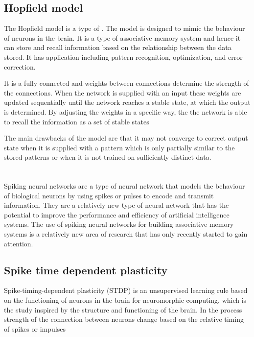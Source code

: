 \subsection{Hopfield model}
The Hopfield model \cite{hopfield} is a type of \rnn. The model is designed to
mimic the behaviour of neurons in the brain. It is a type of associative memory
system and hence it can store and recall information based on the relationship
between the data stored. It has application including pattern recognition,
optimization, and error correction.

It is a fully connected \nn and weights between connections determine the
strength of the connections. When the network is supplied with an input these
weights are updated sequentially until the network reaches a stable state, at
which the output is determined. By adjusting the weights in a specific way, the
the network is able to recall the information as a set of stable states

The main drawbacks of the model are that it may not converge to correct output
state when it is supplied with a pattern which is only partially similar to the
stored patterns or when it is not trained on sufficiently distinct data.

\section{\Snn}
Spiking neural networks are a type of neural network that models the behaviour
of biological neurons by using spikes or pulses to encode and transmit
information. They are a relatively new type of neural network that has the
potential to improve the performance and efficiency of artificial intelligence
systems. The use of spiking neural networks for building associative memory
systems is a relatively new area of research that has only recently started to
gain attention.
\subsection{Spike time dependent plasticity}
Spike-timing-dependent plasticity (STDP)\cite{stdp} is an unsupervised learning
rule based on the functioning of neurons in the brain for neuromorphic
computing, which is the study inspired by the structure and functioning of the
brain. In the process strength of the connection between neurons change based
on the relative timing of spikes or impulses

